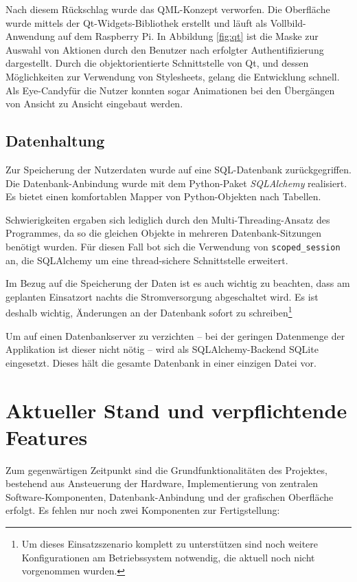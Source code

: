 \documentclass[11pt,a4paper]{IEEEtran}
\begin{document}
Nach diesem Rückschlag wurde das QML-Konzept verworfen. Die Oberfläche wurde
mittels der Qt-Widgets-Bibliothek erstellt und läuft als Vollbild-Anwendung 
auf dem Raspberry Pi. In Abbildung \ref{fig:qt} ist die Maske zur Auswahl von
Aktionen durch den Benutzer nach erfolgter Authentifizierung dargestellt. Durch
die objektorientierte Schnittstelle von Qt, und dessen Möglichkeiten zur
Verwendung von Stylesheets, gelang die Entwicklung schnell. Als 
\glqq Eye-Candy\grqq{ }für die Nutzer konnten sogar Animationen bei den Übergängen von Ansicht
zu Ansicht eingebaut werden.

\subsection{Datenhaltung}

Zur Speicherung der Nutzerdaten wurde auf eine SQL-Datenbank zurückgegriffen.
Die Datenbank-Anbindung wurde mit dem Python-Paket
\emph{SQLAlchemy}\autocite{SQLAlchemy} realisiert. Es bietet einen komfortablen
Mapper von Python-Objekten nach Tabellen. 

Schwierigkeiten ergaben sich lediglich durch den Multi-Threading-Ansatz des 
Programmes, da so die gleichen Objekte in mehreren Datenbank-Sitzungen benötigt
wurden. Für diesen Fall bot sich die Verwendung von \texttt{scoped\_session}
an, die SQLAlchemy um eine thread-sichere Schnittstelle erweitert.

Im Bezug auf die Speicherung der Daten ist es auch wichtig zu beachten, dass am
geplanten Einsatzort nachts die Stromversorgung abgeschaltet wird. Es ist 
deshalb wichtig, Änderungen an der Datenbank sofort zu schreiben\footnote{Um
    dieses Einsatzszenario komplett zu unterstützen sind noch weitere
    Konfigurationen am Betriebssystem notwendig, die aktuell noch nicht
vorgenommen wurden.}

Um auf einen Datenbankserver zu verzichten -- bei der geringen Datenmenge der
Applikation ist dieser nicht nötig -- wird als SQLAlchemy-Backend SQLite
eingesetzt. Dieses hält die gesamte Datenbank in einer einzigen Datei vor. 

\section{Aktueller Stand und verpflichtende Features}

Zum gegenwärtigen Zeitpunkt sind die Grundfunktionalitäten des Projektes,
bestehend aus Ansteuerung der Hardware, Implementierung von zentralen 
Software-Komponenten, Datenbank-Anbindung und der grafischen Oberfläche 
erfolgt. Es fehlen nur noch zwei Komponenten zur Fertigstellung:
\end{document}
